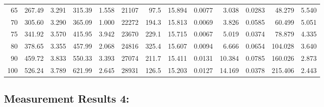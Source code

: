\documentclass[10pt]{article}
\begin{document}
{\begin{tabular}{|r|rr|rr|rr|rr|rr|r|r|}
       65 &       267.49 &        3.291 &       315.39 &        1.558 &        21107 &         97.5 &       15.894 &       0.0077 &        3.038 &       0.0283 &       48.279 &        5.540 \\
       70 &       305.60 &        3.290 &       365.09 &        1.000 &        22272 &        194.3 &       15.813 &       0.0069 &        3.826 &       0.0585 &       60.499 &        5.051 \\
       75 &       341.92 &        3.570 &       415.95 &        3.942 &        23670 &        229.1 &       15.715 &       0.0067 &        5.019 &       0.0374 &       78.879 &        4.335 \\
       80 &       378.65 &        3.355 &       457.99 &        2.068 &        24816 &        325.4 &       15.607 &       0.0094 &        6.666 &       0.0654 &      104.028 &        3.640 \\
       90 &       459.72 &        3.833 &       550.33 &        3.393 &        27074 &        211.7 &       15.411 &       0.0131 &       10.384 &       0.0785 &      160.026 &        2.873 \\
      100 &       526.24 &        3.789 &       621.99 &        2.645 &        28931 &        126.5 &       15.203 &       0.0127 &       14.169 &       0.0378 &      215.406 &        2.443 \\
\hline
\end{tabular}
}



\subsection*{\large \bf Measurement Results 4:}
\end{document}
